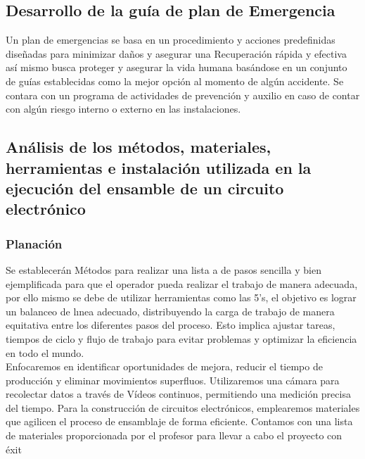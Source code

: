     \subsection{Desarrollo de la guía de plan de Emergencia}
    
    Un plan de emergencias se basa en un procedimiento y acciones predefinidas diseñadas para minimizar daños y asegurar una Recuperación rápida y efectiva así mismo busca proteger y asegurar la vida humana basándose en un conjunto de guías establecidas como la mejor opción al momento de algún accidente. Se contara con un  programa de actividades de prevención y auxilio en caso de contar con algún riesgo interno o externo en las instalaciones.  
    \subsection{Análisis de los métodos, materiales, herramientas e instalación utilizada en la ejecución del ensamble de un circuito electrónico}
    \subsubsection{Planación}
    Se establecerán Métodos para realizar una lista a de pasos sencilla y bien ejemplificada para que el operador pueda realizar el trabajo de manera adecuada, por ello mismo se debe de utilizar herramientas como las 5’s, el objetivo es lograr un balanceo de lınea adecuado, distribuyendo la carga de trabajo de manera equitativa entre los diferentes pasos del proceso. Esto implica ajustar tareas, tiempos de ciclo y flujo de trabajo para evitar problemas y optimizar la eficiencia en todo el mundo.\\
    Enfocaremos en identificar oportunidades de mejora, reducir el tiempo de producción y eliminar movimientos superfluos. Utilizaremos una cámara para recolectar datos a través de Vídeos continuos, permitiendo una medición precisa del tiempo. Para la construcción de circuitos electrónicos, emplearemos materiales que agilicen el proceso de ensamblaje de forma eficiente. Contamos con una lista de materiales proporcionada por el profesor para llevar a cabo el proyecto con éxit
